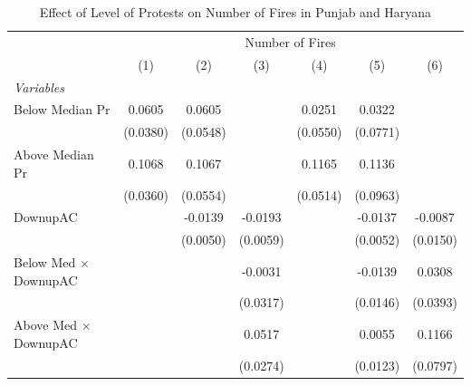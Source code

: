 
\begin{table}[htbp]
   \caption{\label{tab:protest_treat_main} Effect of Level of Protests on Number of Fires in Punjab and Haryana}
   \centering
   \begin{tabular}{lcccccc}
      \tabularnewline \midrule \midrule
       & \multicolumn{6}{c}{Number of Fires}\\
                                                              & (1)           & (2)           & (3)           & (4)           & (5)           & (6)\\  
      \midrule
      \emph{Variables}\\
      Below Median Pr                                         & 0.0605        & 0.0605        &               & 0.0251        & 0.0322        &   \\   
                                                              & (0.0380)      & (0.0548)      &               & (0.0550)      & (0.0771)      &   \\   
      Above Median Pr                                         & 0.1068        & 0.1067        &               & 0.1165        & 0.1136        &   \\   
                                                              & (0.0360)      & (0.0554)      &               & (0.0514)      & (0.0963)      &   \\   
      DownupAC                                                &               & -0.0139       & -0.0193       &               & -0.0137       & -0.0087\\   
                                                              &               & (0.0050)      & (0.0059)      &               & (0.0052)      & (0.0150)\\   
      Below Med $\times$ DownupAC                             &               &               & -0.0031       &               & -0.0139       & 0.0308\\   
                                                              &               &               & (0.0317)      &               & (0.0146)      & (0.0393)\\   
      Above Med $\times$ DownupAC                             &               &               & 0.0517        &               & 0.0055        & 0.1166\\   
                                                              &               &               & (0.0274)      &               & (0.0123)      & (0.0797)\\   

\end{tabular}
\end{table}
